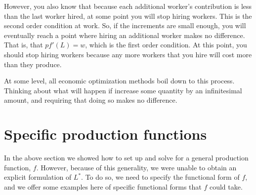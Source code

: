 However, you also know that because each additional worker's contribution is less than the last worker hired, at some point you will stop hiring workers. This is the second order condition at work. So, if the increments are small enough, you will eventually reach a point where hiring an additional worker makes no difference. That is, that $p f'(L) = w$, which is the first order condition. At this point, you should stop hiring workers because any more workers that you hire will cost more than they produce. 

At some level, all economic optimization methods boil down to this process. Thinking about what will happen if increase some quantity by an infinitesimal amount, and requiring that doing so makes no difference. 

\section{Specific production functions}
In the above section we showed how to set up and solve for a general production function, $f$. However, because of this generality, we were unable to obtain an explicit formulation of $L^*$. To do so, we need to specify the functional form of $f$, and we offer some examples here of specific functional forms that $f$ could take.

